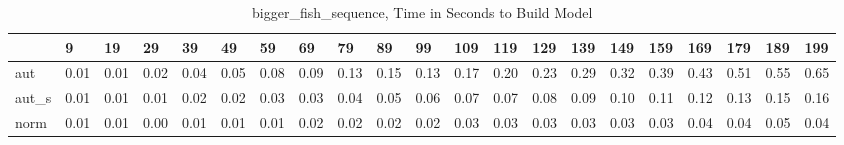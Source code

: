 \begin{table}
\centering
\caption{bigger_fish_sequence, Time in Seconds to Build Model}
\label{bigger_fish_sequence_model_time}
\begin{tabular}{lllllllllllllllllllll}
\toprule
{} &     9 &    19 &    29 &    39 &    49 &    59 &    69 &    79 &    89 &    99 &   109 &   119 &   129 &   139 &   149 &   159 &   169 &   179 &   189 &   199 \\
\midrule
aut   &  0.01 &  0.01 &  0.02 &  0.04 &  0.05 &  0.08 &  0.09 &  0.13 &  0.15 &  0.13 &  0.17 &  0.20 &  0.23 &  0.29 &  0.32 &  0.39 &  0.43 &  0.51 &  0.55 &  0.65 \\
aut\_s &  0.01 &  0.01 &  0.01 &  0.02 &  0.02 &  0.03 &  0.03 &  0.04 &  0.05 &  0.06 &  0.07 &  0.07 &  0.08 &  0.09 &  0.10 &  0.11 &  0.12 &  0.13 &  0.15 &  0.16 \\
norm  &  0.01 &  0.01 &  0.00 &  0.01 &  0.01 &  0.01 &  0.02 &  0.02 &  0.02 &  0.02 &  0.03 &  0.03 &  0.03 &  0.03 &  0.03 &  0.03 &  0.04 &  0.04 &  0.05 &  0.04 \\
\bottomrule
\end{tabular}
\end{table}
